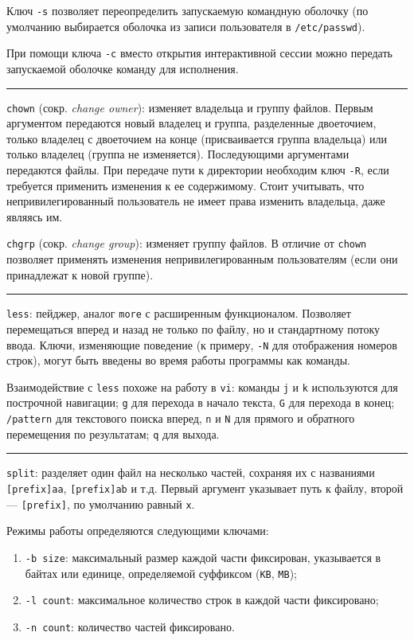 \documentclass[listings]{labreport}
\begin{document}
Ключ \texttt{-s} позволяет переопределить запускаемую командную оболочку
(по умолчанию выбирается оболочка из записи пользователя в \texttt{/etc/passwd}).

При помощи ключа \texttt{-c} вместо открытия интерактивной сессии можно передать запускаемой оболочке команду для исполнения.

\noindent\rule{\textwidth}{1pt}

\texttt{chown} (сокр. \textit{change owner}): изменяет владельца и группу файлов. Первым аргументом передаются новый владелец и группа,
разделенные двоеточием, только владелец с двоеточием на конце (присваивается группа владельца) или только владелец (группа не изменяется).
Последующими аргументами передаются файлы. При передаче пути к директории необходим ключ \texttt{-R}, если требуется применить изменения
к ее содержимому. Стоит учитывать, что непривилегированный пользователь не имеет права изменить владельца, даже являясь им.

\texttt{chgrp} (сокр. \textit{change group}): изменяет группу файлов. В отличие от \texttt{chown} позволяет применять изменения
непривилегированным пользователям (если они принадлежат к новой группе).

\noindent\rule{\textwidth}{1pt}

\texttt{less}: пейджер, аналог \texttt{more} с расширенным функционалом. Позволяет перемещаться вперед и назад не только по файлу, но и
стандартному потоку ввода. Ключи, изменяющие поведение (к примеру, \texttt{-N} для отображения номеров строк), могут быть введены во время
работы программы как команды.

Взаимодействие с \texttt{less} похоже на работу в \texttt{vi}: команды \texttt{j} и \texttt{k} используются для построчной навигации;
\texttt{g} для перехода в начало текста, \texttt{G} для перехода в конец; \texttt{/pattern} для текстового поиска вперед, \texttt{n} и \texttt{N}
для прямого и обратного перемещения по результатам; \texttt{q} для выхода.

\noindent\rule{\textwidth}{1pt}

\texttt{split}: разделяет один файл на несколько частей, сохраняя их с названиями \texttt{[prefix]aa}, \texttt{[prefix]ab} и т.д.
Первый аргумент указывает путь к файлу, второй — \texttt{[prefix]}, по умолчанию равный \texttt{x}.

Режимы работы определяются следующими ключами:

\begin{enumerate}
\item \texttt{-b size}: максимальный размер каждой части фиксирован, указывается в байтах или единице, определяемой суффиксом (\texttt{KB}, \texttt{MB});
\item \texttt{-l count}: максимальное количество строк в каждой части фиксировано;
\item \texttt{-n count}: количество частей фиксировано.
\end{enumerate}
\end{document}
